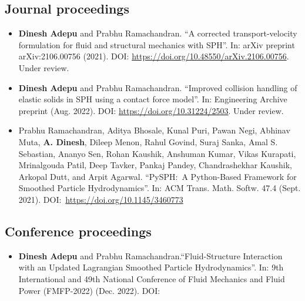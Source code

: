 \listofpublications

\subsection*{Journal proceedings}

\begin{itemize}
\item \textbf{Dinesh Adepu} and Prabhu Ramachandran. ``A corrected
  transport-velocity formulation for fluid and structural mechanics with
  SPH''. In: arXiv preprint arXiv:2106.00756
  (2021). DOI: \url{https://doi.org/10.48550/arXiv.2106.00756}. Under review.


\item \textbf{Dinesh Adepu} and Prabhu Ramachandran. ``Improved collision
  handling of elastic solids in SPH using a contact force model''. In:
  Engineering Archive preprint
  (Aug. 2022). DOI: \url{https://doi.org/10.31224/2503}. Under review.

\item Prabhu Ramachandran, Aditya Bhosale, Kunal Puri, Pawan Negi, Abhinav Muta,
  \textbf{A. Dinesh}, Dileep Menon, Rahul Govind, Suraj Sanka, Amal S. Sebastian, Ananyo
  Sen, Rohan Kaushik, Anshuman Kumar, Vikas Kurapati, Mrinalgouda Patil, Deep
  Tavker, Pankaj Pandey, Chandrashekhar Kaushik, Arkopal Dutt, and Arpit
  Agarwal. ``PySPH:~A Python-Based Framework for Smoothed Particle
  Hydrodynamics''. In: ACM Trans. Math. Softw. 47.4
  (Sept. 2021). DOI:~\url{https://doi.org/10.1145/3460773}
\end{itemize}


\subsection*{Conference proceedings}
\label{sec:conf-proc}
\begin{itemize}
\item \textbf{Dinesh Adepu} and Prabhu Ramachandran.``Fluid-Structure
  Interaction with an Updated Lagrangian Smoothed Particle Hydrodynamics''. In:
  9th International and 49th National Conference of Fluid Mechanics and Fluid
  Power (FMFP-2022) (Dec. 2022). DOI:
\end{itemize}
